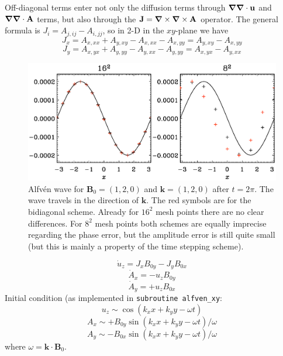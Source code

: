 \documentclass[\mydriver,12pt,twoside,notitlepage,a4paper]{article}
\newcommand{\vekt}[1] {\mathbf{#1}}
\newcommand{\Av}            {\vekt{A}}
\newcommand{\Bv}            {\vekt{B}}
\newcommand{\Jv}            {\vekt{J}}
\newcommand{\kv}            {\vekt{k}}
\newcommand{\uv}            {\vekt{u}}
\newcommand{\nab}{\mbox{\boldmath $\nabla$} {}}
\begin{document}
Off-diagonal terms enter not only the diffusion terms through
$\nab\nab\cdot\uv$ and $\nab\nab\cdot\Av$ terms, but also through
the $\Jv=\nab\times\nab\times\Av$ operator.
The general formula is $J_i=A_{j,ij}-A_{i,jj}$, so in 2-D in the
$xy$-plane we have
\begin{equation}
J_x=A_{x,xx}+A_{y,xy}-A_{x,xx}-A_{x,yy}=A_{y,xy}-A_{x,yy}
\end{equation}
\begin{equation}
J_y=A_{x,yx}+A_{y,yy}-A_{y,xx}-A_{y,yy}=A_{x,yx}-A_{y,xx}
\end{equation}

\begin{figure}[h!]\begin{center}
\includegraphics[width=\columnwidth]{pcompbidiagonal}
\end{center}\caption[]{
Alfv\'en wave for $\Bv_0=(1,2,0)$ and $\kv=(1,2,0)$ after $t=2\pi$.
The wave travels in the direction of $\kv$.
The red symbols are for the bidiagonal scheme.
Already for $16^2$ mesh points there are no clear differences.
For $8^2$ mesh points both schemes are equally imprecise regarding
the phase error, but the amplitude error is still quite small
(but this is mainly a property of the time stepping scheme).
}\label{pcompbidiagonal}\end{figure}

\begin{equation}
\dot{u}_z=J_xB_{0y}-J_yB_{0x}
\end{equation}
\begin{equation}
\dot{A}_x=-u_zB_{0y}
\end{equation}
\begin{equation}
\dot{A}_y=+u_zB_{0x}
\end{equation}
Initial condition (as implemented in \texttt{subroutine alfven\_xy}:
\begin{equation}
u_z\sim\cos(k_xx+k_yy-\omega t)
\end{equation}
\begin{equation}
A_x\sim+B_{0y}\sin(k_xx+k_yy-\omega t)/\omega
\end{equation}
\begin{equation}
A_y\sim-B_{0x}\sin(k_xx+k_yy-\omega t)/\omega
\end{equation}
where $\omega=\kv\cdot\Bv_0$.
\end{document}
